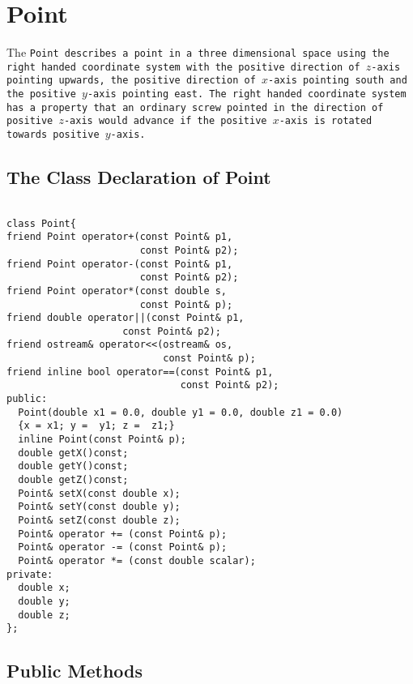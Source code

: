 \section{Point}

The \tt Point \rm describes a point in a three dimensional space using
the  right handed  coordinate system  with the  positive  direction of
$z$-axis pointing upwards, the positive direction of $x$-axis pointing
south  and the  positive  $y$-axis pointing  east.   The right  handed
coordinate system has a property that an ordinary screw pointed in the
direction of positive $z$-axis  would advance if the positive $x$-axis
is rotated towards positive $y$-axis.

\subsection{The Class Declaration of Point}
\begin{verbatim}

class Point{
friend Point operator+(const Point& p1, 
                       const Point& p2);
friend Point operator-(const Point& p1,
                       const Point& p2);
friend Point operator*(const double s, 
                       const Point& p);
friend double operator||(const Point& p1, 
                    const Point& p2);
friend ostream& operator<<(ostream& os, 
                           const Point& p);
friend inline bool operator==(const Point& p1, 
                              const Point& p2);
public:
  Point(double x1 = 0.0, double y1 = 0.0, double z1 = 0.0)
  {x = x1; y =  y1; z =  z1;}
  inline Point(const Point& p);
  double getX()const;
  double getY()const;
  double getZ()const;
  Point& setX(const double x);
  Point& setY(const double y);
  Point& setZ(const double z);
  Point& operator += (const Point& p); 
  Point& operator -= (const Point& p);
  Point& operator *= (const double scalar);
private:
  double x;
  double y;
  double z;
};
\end{verbatim}


\subsection{Public Methods}

